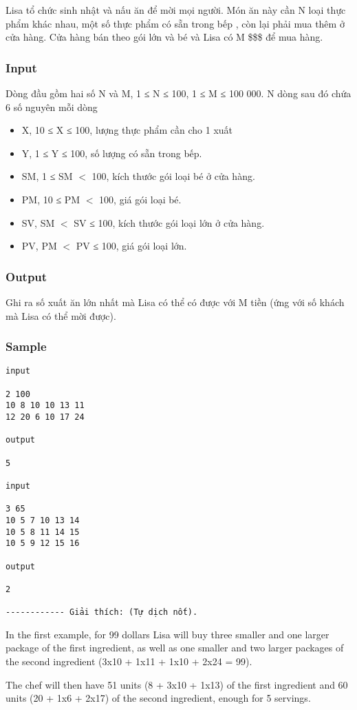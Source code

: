

Lisa tổ chức sinh nhật và nấu ăn để mời mọi người. Món ăn này cần N loại thực phẩm khác nhau, một số thực phẩm có sẵn trong bếp , còn lại phải mua thêm ở cửa hàng. Cửa hàng bán theo gói lớn và bé và Lisa có M \$\$\$ để mua hàng.

\subsubsection{Input}

Dòng đầu gồm hai số N và M, 1 ≤ N ≤ 100, 1 ≤ M ≤ 100 000. N dòng sau đó chứa 6 số nguyên mỗi dòng
\begin{itemize}
	\item X, 10 ≤ X ≤ 100, lượng thực phẩm cần cho 1 xuất
	\item Y, 1 ≤ Y ≤ 100, số lượng có sẵn trong bếp.
	\item SM, 1 ≤ SM $<$ 100, kích thước gói loại bé ở cửa hàng.
	\item PM, 10 ≤ PM $<$ 100, giá gói loại bé.
	\item SV, SM $<$ SV ≤ 100, kích thước gói loại lớn ở cửa hàng.
	\item PV, PM $<$ PV ≤ 100, giá gói loại lớn.
\end{itemize}

\subsubsection{Output}

Ghi ra số xuất ăn lớn nhất mà Lisa có thể có được với M tiền (ứng với số khách mà Lisa có thể mời được).

\subsubsection{Sample}
\begin{verbatim}
input 
 
2 100 
10 8 10 10 13 11 
12 20 6 10 17 24 
 
output 
 
5

input 
 
3 65 
10 5 7 10 13 14 
10 5 8 11 14 15 
10 5 9 12 15 16 
 
output 
 
2

------------ Giải thích: (Tự dịch nốt).\end{verbatim}

In the first example, for 99 dollars Lisa will buy three smaller and one larger package of the first ingredient, as well as one smaller and two larger packages of the second ingredient (3x10 + 1x11 + 1x10 + 2x24 = 99).

The chef will then have 51 units (8 + 3x10 + 1x13) of the first ingredient and 60 units (20 + 1x6 + 2x17) of the second ingredient, enough for 5 servings.